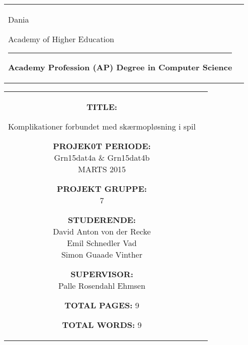 



	
\thispagestyle{empty}
\begin{titlepage}
\begin{nopagebreak}
{\samepage 
\begin{tabular}{lr}
\parbox{14.5cm}{
  {\LARGE Dania}

  {\small Academy of Higher Education}
  \vspace{-0.3cm}\\
\hrule
\vspace{0.2cm}
  {\bf Academy Profession (AP) Degree in Computer Science}
 }   & \hspace{-2.8cm} { }
\end{tabular}
  

\begin{tabular}{cc}
\parbox{8cm}{
\hspace{2cm}
\begin{description}

\item {\bf TITLE:} 

  Komplikationer forbundet med skærmopløsning i spil

\end{description}

\parbox{8cm}{

\begin{description}
\item {\bf PROJEK0T PERIODE:}\\
  Grn15dat4a \& Grn15dat4b \\
  MARTS 2015\\
  \hspace{4cm}
\item {\bf PROJEKT GRUPPE:}\\
  7\\
  \hspace{4cm}
\item {\bf STUDERENDE:}\\
  David Anton von der Recke\\
  Emil Schnedler Vad\\
  Simon Guaade Vinther\\  
  \hspace{2cm}
\item {\bf SUPERVISOR:}\\
  Palle Rosendahl Ehmsen\\
\end{description}
}
\begin{description}
\item{ {\bf TOTAL PAGES:} 9 }
\item{ {\bf TOTAL WORDS:} 9 }
\end{description}
\vfill } &
\parbox{7cm}{
  \vspace{.15cm}
  \flushright
     }
\end{tabular}
}
\end{nopagebreak}
\end{titlepage}
	
